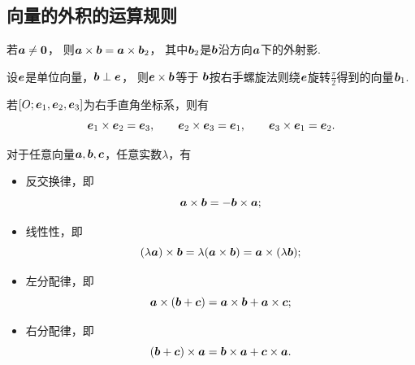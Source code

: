 \subsection{向量的外积的运算规则}
\begin{theorem}
若\(\boldsymbol{a}\neq\boldsymbol{0}\)，
则\(\boldsymbol{a}\times\boldsymbol{b}=\boldsymbol{a}\times\boldsymbol{b}_2\)，
其中\(\boldsymbol{b}_2\)是\(\boldsymbol{b}\)沿方向\(\boldsymbol{a}\)下的外射影.
\end{theorem}

\begin{theorem}
设\(\boldsymbol{e}\)是单位向量，\(\boldsymbol{b}\perp\boldsymbol{e}\)，
则\(\boldsymbol{e}\times\boldsymbol{b}\)等于
\(\boldsymbol{b}\)按右手螺旋法则绕\(\boldsymbol{e}\)旋转\(\frac{\pi}{2}\)得到的向量\(\boldsymbol{b}_1\).
\end{theorem}

\begin{corollary}
若\([O;\boldsymbol{e}_1,\boldsymbol{e}_2,\boldsymbol{e}_3]\)为右手直角坐标系，则有\begin{equation*}
	\boldsymbol{e}_1\times\boldsymbol{e}_2 = \boldsymbol{e}_3, \qquad
	\boldsymbol{e}_2\times\boldsymbol{e}_3 = \boldsymbol{e}_1, \qquad
	\boldsymbol{e}_3\times\boldsymbol{e}_1 = \boldsymbol{e}_2.
\end{equation*}
\end{corollary}

\begin{theorem}
对于任意向量\(\boldsymbol{a},\boldsymbol{b},\boldsymbol{c}\)，任意实数\(\lambda\)，有
\begin{itemize}
	\item 反交换律，即\begin{equation*}
		\boldsymbol{a}\times\boldsymbol{b}
		= -\boldsymbol{b}\times\boldsymbol{a};
	\end{equation*}
	\item 线性性，即\begin{equation*}
		(\lambda \boldsymbol{a})\times\boldsymbol{b}
		= \lambda(\boldsymbol{a}\times\boldsymbol{b})
		= \boldsymbol{a}\times(\lambda \boldsymbol{b});
	\end{equation*}
	\item 左分配律，即\begin{equation*}
		\boldsymbol{a}\times(\boldsymbol{b}+\boldsymbol{c})
		= \boldsymbol{a}\times\boldsymbol{b}
		+ \boldsymbol{a}\times\boldsymbol{c};
	\end{equation*}
	\item 右分配律，即\begin{equation*}
		(\boldsymbol{b}+\boldsymbol{c})\times\boldsymbol{a}
		= \boldsymbol{b}\times\boldsymbol{a}
		+ \boldsymbol{c}\times\boldsymbol{a}.
	\end{equation*}
\end{itemize}
\end{theorem}

